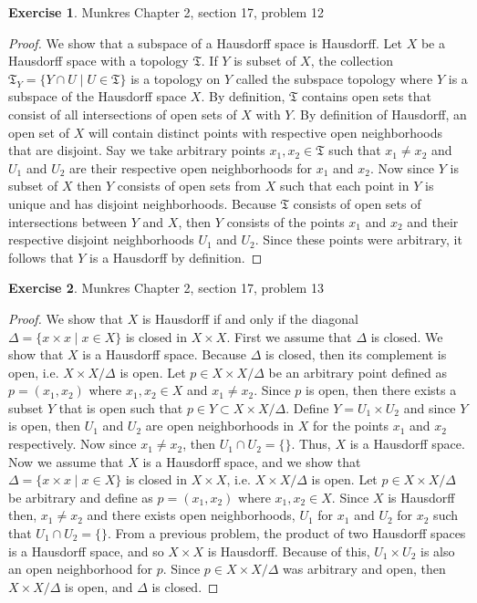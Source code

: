 \documentclass[12pt]{article}
\theoremstyle{definition}
\newtheorem{exercise}{Exercise}
\begin{document}
\begin{exercise} Munkres Chapter 2, section 17, problem 12 
\begin{proof}
	We show that a subspace of a Hausdorff space is Hausdorff. Let $X$ be a Hausdorff space with a topology $\mathfrak{T}$. If $Y$ is subset of $X$, the collection $\mathfrak{T}_Y=\{Y\cap U\mid U\in\mathfrak{T}\}$ is a topology on $Y$ called the subspace topology where $Y$ is a subspace of the Hausdorff space $X$. By definition, $\mathfrak{T}$ contains open sets that consist of all intersections of open sets of $X$ with $Y$. By definition of Hausdorff, an open set of $X$ will contain distinct points with respective open neighborhoods that are disjoint. Say we take arbitrary points $x_1,x_2\in\mathfrak{T}$ such that $x_1\neq x_2$ and $U_1$ and $U_2$ are their respective open neighborhoods for $x_1$ and $x_2$. Now since $Y$ is subset of $X$ then $Y$ consists of open sets from $X$ such that each point in $Y$ is unique and has disjoint neighborhoods. Because $\mathfrak{T}$ consists of open sets of intersections between $Y$ and $X$, then $Y$ consists of the points $x_1$ and $x_2$ and their respective disjoint neighborhoods $U_1$ and $U_2$. Since these points were arbitrary, it follows that $Y$ is a Hausdorff by definition. 
\end{proof}
\end{exercise}

\begin{exercise} Munkres Chapter 2, section 17, problem 13 
\begin{proof}
	We show that $X$ is Hausdorff if and only if the diagonal $\Delta=\{x\times x\mid x\in X\}$ is closed in $X\times X$. First we assume that $\Delta$ is closed. We show that $X$ is a Hausdorff space. Because $\Delta$ is closed, then its complement is open, i.e. $X\times X/\Delta$ is open. Let $p\in X\times X/\Delta$ be an arbitrary point defined as $p=(x_1,x_2)$ where $x_1,x_2\in X$ and $x_1\neq x_2$. Since $p$ is open, then there exists a subset $Y$ that is open such that $p\in Y\subset X\times X/\Delta$. Define $Y=U_1\times U_2$ and since $Y$ is open, then $U_1$ and $U_2$ are open neighborhoods in $X$ for the points $x_1$ and $x_2$ respectively. Now since $x_1\neq x_2$, then $U_1\cap U_2=\{\}$. Thus, $X$ is a Hausdorff space. Now we assume that $X$ is a Hausdorff space, and we show that $\Delta=\{x\times x\mid x\in X\}$ is closed in $X\times X$, i.e. $X\times X/\Delta$ is open. Let $p\in X\times X/\Delta$ be arbitrary and define as $p=(x_1,x_2)$ where $x_1,x_2\in X$. Since $X$ is Hausdorff then, $x_1\neq x_2$ and there exists open neighborhoods, $U_1$ for $x_1$ and $U_2$ for $x_2$ such that $U_1\cap U_2=\{\}$. From a previous problem, the product of two Hausdorff spaces is a Hausdorff space, and so $X\times X$ is Hausdorff. Because of this, $U_1\times U_2$ is also an open neighborhood for $p$. Since $p\in X\times X/\Delta$ was arbitrary and open, then $X\times X/\Delta$ is open, and $\Delta$ is closed. 
\end{proof}
\end{exercise}
\end{document}
